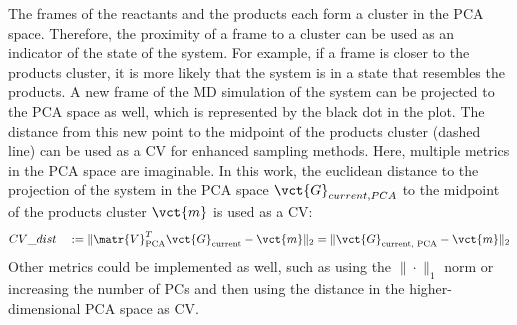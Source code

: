 The frames of the reactants and the products each form a cluster in the PCA space. Therefore, the proximity of a frame to a cluster can be used as an indicator of the state of the system. For example, if a frame is closer to the products cluster, it is more likely that the system is in a state that resembles the products.
A new frame of the MD simulation of the system can be projected to the PCA space as well, which is represented by the black dot in the plot. The distance from this new point to the midpoint of the products cluster (dashed line) can be used as a CV for enhanced sampling methods.
Here, multiple metrics in the PCA space are imaginable. In this work, the euclidean distance to the projection of the system in the PCA space $ \vct{G}_{current, PCA} $ to the midpoint of the products cluster $ \vct{m} $ is used as a CV:
\begin{align} \label{eq: constructed_CV}
CV\_dist \quad := \| \matr{V}_{\text{PCA}}^T \vct{G}_{\text{current}} - \vct{m} \|_2 = \| \vct{G}_{\text{current, PCA}} - \vct{m} \|_2
\end{align}
Other metrics could be implemented as well, such as using the $\|\cdot\|_1$ norm or increasing the number of PCs and then using the distance in the higher-dimensional PCA space as CV.



